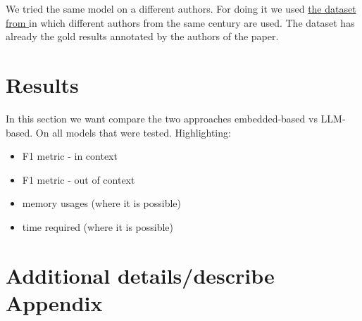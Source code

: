 \documentclass[11pt]{article}
\begin{document}
We tried the same model on a different authors.
For doing it we used \href{https://optuna.org/}{the dataset from   \cite{redaelli-sprugnoli-2024-sentence}} in which different authors
from the same century are used.
The dataset has already the gold results annotated by the authors of the paper.

\section{Results}

In this section we want compare the two approaches embedded-based vs LLM-based.
On all models that were tested.
Highlighting:

 \begin{itemize}
	\item F1 metric - in context
	\item F1 metric - out of context
	\item memory usages (where it is possible)
	\item time required (where it is possible)
\end{itemize}

\appendix
\section{Additional details/describe Appendix}
\label{sec:appendix1}


\end{document}

